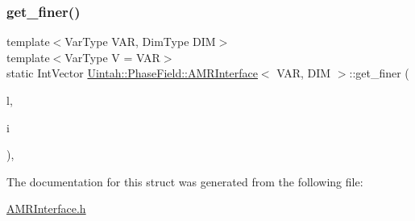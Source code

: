 \mbox{\label{structUintah_1_1PhaseField_1_1AMRInterface_a5b3ace8289c6b187d6d42c2e19dec9f4}} 
\subsubsection{\texorpdfstring{get\+\_\+finer()}{get\_finer()}}
{\footnotesize\ttfamily template$<$Var\+Type V\+AR, Dim\+Type D\+IM$>$ \\
template$<$Var\+Type V = V\+AR$>$ \\
static Int\+Vector \hyperlink{structUintah_1_1PhaseField_1_1AMRInterface}{Uintah\+::\+Phase\+Field\+::\+A\+M\+R\+Interface}$<$ V\+AR, D\+IM $>$\+::get\+\_\+finer (\begin{DoxyParamCaption}\item[{const Level $\ast$}]{l,  }\item[{const Int\+Vector \&}]{i }\end{DoxyParamCaption})\hspace{0.3cm}{\ttfamily [inline]}, {\ttfamily [static]}}



The documentation for this struct was generated from the following file\+:\begin{DoxyCompactItemize}
\item 
\hyperlink{AMRInterface_8h}{A\+M\+R\+Interface.\+h}\end{DoxyCompactItemize}
